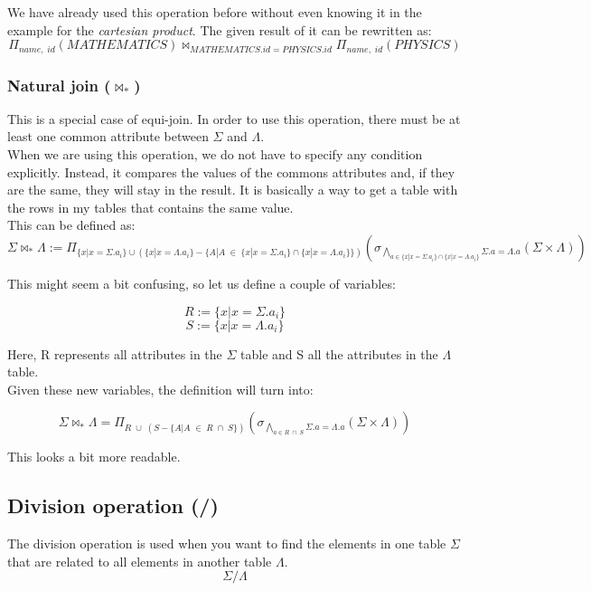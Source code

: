 \documentclass[12pt]{article}
\begin{document}
We have already used this operation before without even knowing it in the example for the \emph{cartesian product}. The given result of it can be rewritten as:
\[
    \Pi_{name,\;id}(MATHEMATICS) \bowtie_{MATHEMATICS.id=PHYSICS.id}  \Pi_{name,\;id}(PHYSICS)
\]

\subsubsection{Natural join (\( \bowtie_* \))}

This is a special case of equi-join. In order to use this operation, there must be at least one common attribute between \(\Sigma\) and \(\Lambda\). \\
When we are using this operation, we do not have to specify any condition explicitly. Instead, it compares the values of the commons attributes and, if they are the same, they will stay in the result. It is basically a way to get a table with the rows in my tables that contains the same value.\\
This can be defined as:
\[
    \Sigma \bowtie_* \Lambda := \Pi_{\{x|x=\Sigma.a_i\} \cup (\{x|x=\Lambda.a_i\} - \{A | A \;\in\; \{x|x=\Sigma.a_i\} \cap  \{x|x=\Lambda.a_i\}\})} (\sigma_{\bigwedge_{a \in \{x|x=\Sigma.a_i\} \cap  \{x|x=\Lambda.a_i\}} \Sigma.a = \Lambda.a}(\Sigma \times \Lambda))
\]

This might seem a bit confusing, so let us define a couple of variables:

\[
    R:=\{x|x=\Sigma.a_i\}
\]
\[
    S:=\{x|x=\Lambda.a_i\}
\]

Here, R represents all attributes in the \(\Sigma\) table and S all the attributes in the \(\Lambda\) table.\\
Given these new variables, the definition will turn into:

\[
    \Sigma \bowtie_* \Lambda = \Pi_{R \;\cup\; (S - \{A | A \;\in\; R \;\cap\; S\})} (\sigma_{\bigwedge_{a \in R \;\cap\; S} \Sigma.a = \Lambda.a}(\Sigma \times \Lambda))
\]

This looks a bit more readable.

\subsection{Division operation (/)}

The division operation is used when you want to find the elements in one table \(\Sigma\) that are related to all elements in another table \(\Lambda\). \\
\[
    \Sigma / \Lambda
\]
\end{document}
